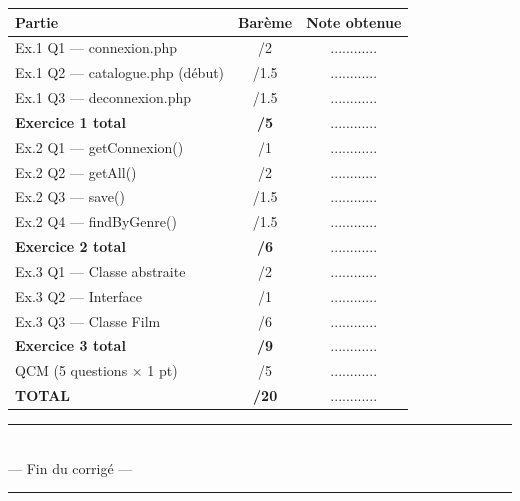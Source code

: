 \documentclass[11pt,a4paper]{article}
\begin{document}
\begin{center}
\renewcommand{\arraystretch}{1.4}
\begin{tabular}{|l|c|c|}
  \hline
  \rowcolor{uirblue!20}
  \textbf{Partie} & \textbf{Barème} & \textbf{Note obtenue} \\
  \hline
  Ex.1 Q1 --- connexion.php         & /2   & ............ \\
  Ex.1 Q2 --- catalogue.php (début) & /1.5 & ............ \\
  Ex.1 Q3 --- deconnexion.php       & /1.5 & ............ \\
  \hline
  \textbf{Exercice 1 total}         & \textbf{/5} & ............ \\
  \hline
  Ex.2 Q1 --- getConnexion()        & /1   & ............ \\
  Ex.2 Q2 --- getAll()              & /2   & ............ \\
  Ex.2 Q3 --- save()                & /1.5 & ............ \\
  Ex.2 Q4 --- findByGenre()         & /1.5 & ............ \\
  \hline
  \textbf{Exercice 2 total}         & \textbf{/6} & ............ \\
  \hline
  Ex.3 Q1 --- Classe abstraite      & /2   & ............ \\
  Ex.3 Q2 --- Interface             & /1   & ............ \\
  Ex.3 Q3 --- Classe Film           & /6   & ............ \\
  \hline
  \textbf{Exercice 3 total}         & \textbf{/9} & ............ \\
  \hline
  QCM (5 questions × 1 pt)         & /5   & ............ \\
  \hline
  \rowcolor{uirgold!30}
  \textbf{TOTAL}                   & \textbf{/20} & ............ \\
  \hline
\end{tabular}
\end{center}

\vspace{8pt}
\begin{center}
  \rule{6cm}{0.4pt}\\[4pt]
  {\large --- Fin du corrigé ---}\\
  \rule{6cm}{0.4pt}
\end{center}
\end{document}
